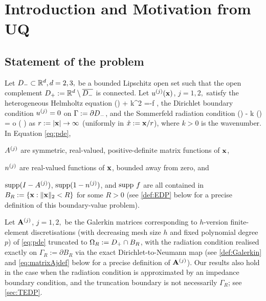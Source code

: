 
\section{Introduction and Motivation from UQ}\label{sec:intronbpc}

\subsection{Statement of the problem}\label{sec:problem}
Let $D_{-} \subset \mathbb R^{d}, d=2,3, $ be a bounded Lipschitz open set such that the open complement $D_{+}:= \mathbb R^{d}\setminus\overline{D_{-}}$ is connected. 
Let $u^{(j)}(\mathbf{x})$, $j=1,2,$ satisfy 
the heterogeneous Helmholtz equation
\beq\label{eq:pde}
\nabla\cdot(\Aj \nabla\uj ) + k^2 \nj \uj =-f \quad \tin \Dp,
\eeq
the Dirichlet boundary condition $u^{(j)}=0$ on $\Gamma:= \partial D_{-}$, and the Sommerfeld radiation condition 
\beq\label{eq:srcnbpc}
(\bx) - \ri k \uj(\bx) = o \left( \right)
\eeq
as $r:= |\mathbf{x}|\rightarrow \infty$ (uniformly in $\hat{x}:= \mathbf{x}/r$),
where $k>0$ is the wavenumber. In Equation \cref{eq:pde},
\ben
\item $A^{(j)}$ are symmetric, real-valued, positive-definite  matrix functions of $\mathbf{x}$, 
\item $n^{(j)}$ are real-valued functions of $\mathbf{x}$, bounded away from zero, and 
\item $\operatorname{supp}(I-A^{(j)})$, $\operatorname{supp}(1-n^{(j)})$, and $\operatorname{supp}\, f$ are all %
contained in $B_R:= \{\mathbf{x} : \|\mathbf{x}\|_2<R\}$ for some $R>0$
\een
(see \cref{def:EDP} below for a precise definition of this boundary-value problem).

Let $\mathbf{A}^{(j)}$, $j=1,2,$ be the Galerkin matrices corresponding to $h$-version finite-element discretisations (with decreasing mesh size $h$ and fixed polynomial degree $p$)
of \cref{eq:pde} truncated to $\Omega_R:= D_{+} \cap B_R$, with the radiation condition realised exactly on $\Gamma_R:=\partial B_R$ via the exact Dirichlet-to-Neumann map (see \cref{def:Galerkin} and \cref{eq:matrixAjdef} below for a precise definition of $\mathbf{A}^{(j)}$). Our results also hold in the case when the radiation condition is approximated by an impedance boundary condition, and the truncation boundary is not necessarily $\Gamma_R$; see \cref{sec:TEDP}.
 
